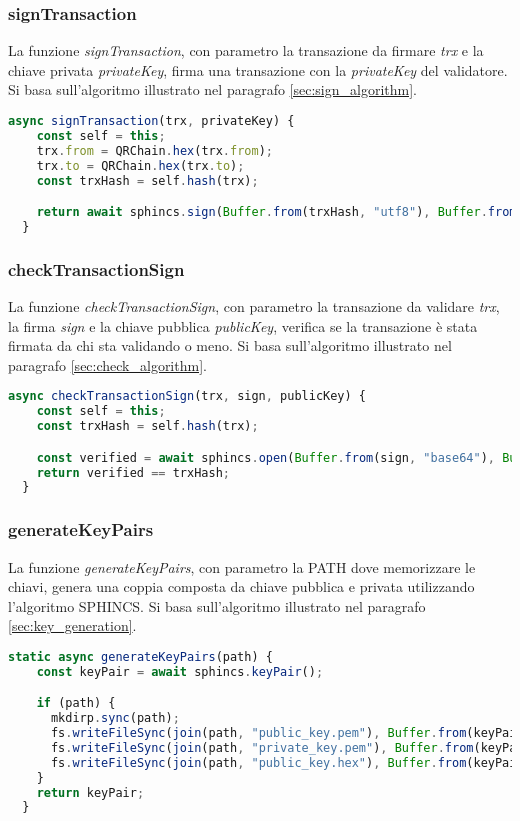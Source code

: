 \subsubsection{signTransaction}
La funzione \textit{signTransaction}, con parametro la transazione da firmare \textit{trx} e la chiave privata \textit{privateKey}, firma una transazione con la \textit{privateKey} del validatore. Si basa sull'algoritmo illustrato nel paragrafo \ref{sec:sign_algorithm}.
\\
\begin{lstlisting}[language=JavaScript,breaklines]
  async signTransaction(trx, privateKey) {
    const self = this;
    trx.from = QRChain.hex(trx.from);
    trx.to = QRChain.hex(trx.to);
    const trxHash = self.hash(trx);

    return await sphincs.sign(Buffer.from(trxHash, "utf8"), Buffer.from(privateKey, 'hex'))
  }
\end{lstlisting}

\subsubsection{checkTransactionSign}
La funzione \textit{checkTransactionSign}, con parametro la transazione da validare \textit{trx}, la firma \textit{sign} e la chiave pubblica \textit{publicKey}, verifica se la transazione è stata firmata da chi sta validando o meno. Si basa sull'algoritmo illustrato nel paragrafo \ref{sec:check_algorithm}.
\\
\begin{lstlisting}[language=JavaScript,breaklines]
  async checkTransactionSign(trx, sign, publicKey) {
    const self = this;
    const trxHash = self.hash(trx);

    const verified = await sphincs.open(Buffer.from(sign, "base64"), Buffer.from(publicKey, 'hex'));
    return verified == trxHash;
  }
\end{lstlisting}

\subsubsection{generateKeyPairs}
La funzione \textit{generateKeyPairs}, con parametro la PATH dove memorizzare le chiavi, genera una coppia composta da chiave pubblica e privata utilizzando l'algoritmo SPHINCS. Si basa sull'algoritmo illustrato nel paragrafo \ref{sec:key_generation}.
\\
\begin{lstlisting}[language=JavaScript,breaklines]
  static async generateKeyPairs(path) {
    const keyPair = await sphincs.keyPair();

    if (path) {
      mkdirp.sync(path);
      fs.writeFileSync(join(path, "public_key.pem"), Buffer.from(keyPair.publicKey).toString('hex'));
      fs.writeFileSync(join(path, "private_key.pem"), Buffer.from(keyPair.privateKey).toString('hex'));
      fs.writeFileSync(join(path, "public_key.hex"), Buffer.from(keyPair.publicKey).toString('hex'));
    }
    return keyPair;
  }
\end{lstlisting}

